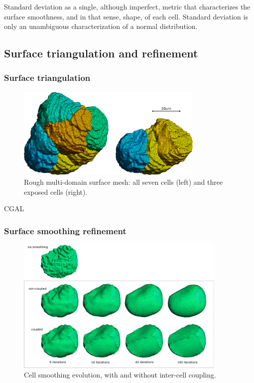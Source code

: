 \documentclass[a4paper,10pt]{article}
\begin{document}
Standard deviation as a single, although imperfect, metric that characterizes the surface smoothness, and in that sense, shape, of each cell.
Standard deviation is only an unambiguous characterization of a normal distribution.\\ 

\subsection{Surface triangulation and refinement}

\subsubsection{Surface triangulation}

\begin{figure}[H]
\begin{center}
\includegraphics[width=0.8\textwidth]{images/rough.pdf}
\end{center}
\caption{Rough multi-domain surface mesh: all seven cells (left) and three exposed cells (right).}
\label{fig:rough}
\end{figure}

CGAL\\

\subsubsection{Surface smoothing refinement}

\begin{figure}[H]
\begin{center}
\includegraphics[width=0.9\textwidth]{images/evolution.pdf}
\end{center}
\caption{Cell smoothing evolution, with and without inter-cell coupling.}
\label{fig:cell_morph}
\end{figure}
\end{document}
